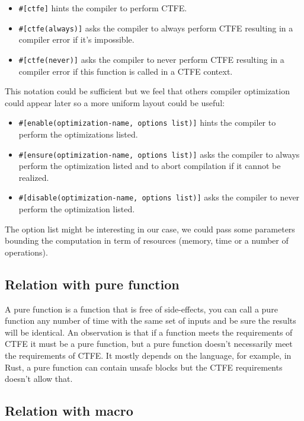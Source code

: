 \documentclass[a4paper,11pt]{article}
\begin{document}
\begin{itemize}
\item \lstinline{#[ctfe]} hints the compiler to perform CTFE.
\item \lstinline{#[ctfe(always)]} asks the compiler to always perform CTFE resulting in a compiler error if it's impossible.
\item \lstinline{#[ctfe(never)]} asks the compiler to never perform CTFE resulting in a compiler error if this function is called in a CTFE context.
\end{itemize}

This notation could be sufficient but we feel that others compiler optimization could appear later so a more uniform layout could be useful:

\begin{itemize}
\item \lstinline{#[enable(optimization-name, options list)]} hints the compiler to perform the optimizations listed.
\item \lstinline{#[ensure(optimization-name, options list)]} asks the compiler to always perform the optimization listed and to abort compilation if it cannot be realized.
\item \lstinline{#[disable(optimization-name, options list)]} asks the compiler to never perform the optimization listed.
\end{itemize}

The option list might be interesting in our case, we could pass some parameters bounding the computation in term of resources (memory, time or a number of operations).

\subsection{Relation with pure function}
\label{relation-pure}

A pure function is a function that is free of side-effects, you can call a pure function any number of time with the same set of inputs and be sure the results will be identical. An observation is that if a function meets the requirements of CTFE it must be a pure function, but a pure function doesn't necessarily meet the requirements of CTFE. It mostly depends on the language, for example, in Rust, a pure function can contain unsafe blocks but the CTFE requirements doesn't allow that.

\subsection{Relation with macro}
\label{relation-macro}
\end{document}
